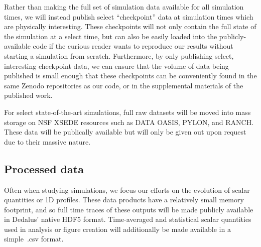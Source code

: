 \documentclass[aasms,11pt]{article}
\begin{document}
Rather than making the full set of simulation data available for all simulation times, we will instead publish select ``checkpoint'' data at simulation times which are physically interesting.
These checkpoints will not only contain the full state of the simulation at a select time, but can also be easily loaded into the publicly-available code if the curious reader wants to reproduce our results without starting a simulation from scratch.
Furthermore, by only publishing select, interesting checkpoint data, we can ensure that the volume of data being published is small enough that these checkpoints can be conveniently found in the same Zenodo repositories as our code, or in the supplemental materials of the published work.

For select state-of-the-art simulations, full raw datasets will be moved into mass storage on NSF XSEDE resources such as DATA OASIS, PYLON, and RANCH.
These data will be publically available but will only be given out upon request due to their massive nature.

\subsection{Processed data}
Often when studying simulations, we focus our efforts on the evolution of scalar quantities or 1D profiles.
These data products have a relatively small memory footprint, and so full time traces of these outputs will be made publicly available in Dedalus' native HDF5 format.
Time-averaged and statistical scalar quantities used in analysis or figure creation will additionally be made available in a simple~.csv format.
\end{document}
